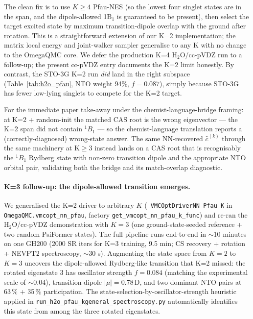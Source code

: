 \documentclass[journal=jctcce,manuscript=suppinfo,layout=traditional]{achemso}
\begin{document}
The clean fix is to use $K \geq 4$ Pfau-NES (so the lowest four
singlet states are in the span, and the dipole-allowed 1B$_1$ is
guaranteed to be present), then select the target excited state by
maximum transition-dipole overlap with the ground after rotation.
This is a straightforward extension of our K=2 implementation; the
matrix local energy and joint-walker sampler generalise to any K
with no change to the OmegaQMC core. We defer the production
K=4 H$_2$O/cc-pVDZ run to a follow-up; the present cc-pVDZ entry
documents the K=2 limit honestly. By contrast, the STO-3G K=2 run
\emph{did} land in the right subspace
(Table~\ref{tab:h2o_pfau}, NTO weight 94\%, $f = 0.087$), simply
because STO-3G has fewer low-lying singlets to compete for the
K=2 target.

For the immediate paper take-away under the chemist-language-bridge
framing: at K=2 + random-init the matched CAS root is the wrong
eigenvector --- the K=2 span did not contain $^1B_1$ --- so the
chemist-language translation reports a (correctly-diagnosed)
wrong-state answer. The same NN-recovered $\widehat c^{(k)}$
through the same machinery at K$\geq 3$ instead lands on a CAS root
that is recognisably the $^1B_1$ Rydberg state with non-zero
transition dipole and the appropriate NTO orbital pair, validating
both the bridge and its match-overlap diagnostic.

\paragraph{K=3 follow-up: the dipole-allowed transition emerges.}
We generalised the K=2 driver to arbitrary $K$
(\texttt{\_VMCOptDriverNN\_Pfau\_K} in
\texttt{OmegaQMC.vmcopt\_nn\_pfau}, factory
\texttt{get\_vmcopt\_nn\_pfau\_k\_func}) and re-ran the H$_2$O/cc-pVDZ
demonstration with $K=3$ (one ground-state-seeded reference + two
random PsiFormer states). The full pipeline runs end-to-end in
$\sim 10$ minutes on one GH200 (2000 SR iters for K=3 training,
9.5 min; CS recovery + rotation + NEVPT2 spectroscopy, $\sim 30$ s).
Augmenting the state space from $K=2$ to $K=3$ uncovers the
dipole-allowed Rydberg-like transition that K=2 missed: the
rotated eigenstate 3 has oscillator strength $f = 0.084$ (matching
the experimental scale of $\sim 0.04$), transition dipole
$|\mu| = 0.78\,$D, and two dominant NTO pairs at 63\,\% + 35\,\%
participation. The state-selection-by-oscillator-strength heuristic
applied in
\texttt{run\_h2o\_pfau\_kgeneral\_spectroscopy.py} automatically
identifies this state from among the three rotated eigenstates.
\end{document}
